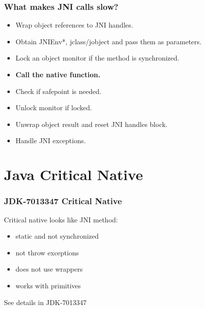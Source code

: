 \documentclass{beamer}
\begin{document}
  	\begin{frame}
  		\frametitle{What makes JNI calls slow?}
  		\begin{itemize}
  			\item {\color{gray} Wrap object references to JNI handles.}
  			\item {\color{gray} Obtain JNIEnv*, jclass/jobject and pass them as parameters.}
  			\item {\color{gray} Lock an object monitor if the method is synchronized.}
  			\item \textbf{Call the native function.}
  			\item {\color{gray} Check if safepoint is needed.}
  			\item {\color{gray} Unlock monitor if locked.}
  			\item {\color{gray} Unwrap object result and reset JNI handles block.}
  			\item {\color{gray} Handle JNI exceptions.}
  		\end{itemize}
  	\end{frame}
  	\section{Java Critical Native}	
  	\begin{frame}
  		\frametitle{JDK-7013347 Critical Native}
  		Critical native looks like JNI method:
  		\begin{itemize}
  			\item static and not synchronized
  			\item not throw exceptions
  			\item does not use wrappers
  			\item works with primitives
  		\end{itemize}
  		\vskip15pt
  		See details in JDK-7013347
  	\end{frame}
\end{document}
